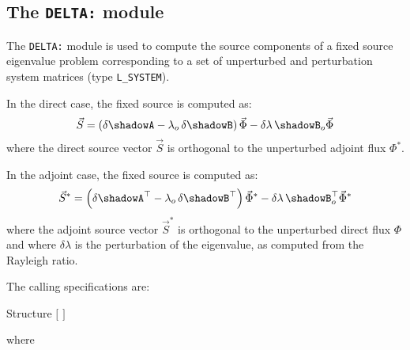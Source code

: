 \subsection{The {\tt DELTA:} module}

The {\tt DELTA:} module is used to compute the source components of a fixed source eigenvalue problem corresponding to a set of 
unperturbed and perturbation system matrices (type {\tt L\_SYSTEM}).

In the direct case, the fixed source is computed as:
\begin{equation}
\vec S=\left( \delta\shadowA - \lambda_o \, \delta \shadowB\right) \vec \Phi - \delta \lambda \, \shadowB_o\vec \Phi
\end{equation}
\noindent where the direct source vector $\vec S$ is orthogonal to the unperturbed adjoint flux $\Phi^*$.

In the adjoint case, the fixed source is computed as:
\begin{equation}
\vec S^*=\left( \delta \shadowA^\top - \lambda_o \, \delta \shadowB^\top\right) \vec \Phi^*- \delta \lambda \, \shadowB_o^\top\vec \Phi^*
\end{equation}
\noindent where the adjoint source vector $\vec S^*$ is orthogonal to the unperturbed direct flux $\Phi$ and where $\delta \lambda$ is the perturbation of the eigenvalue, as computed from the Rayleigh ratio.

The calling specifications are:

\begin{DataStructure}{Structure }
 \moc{:=}  $[$  $]$     \moc{::} 
\end{DataStructure}

\goodbreak
\noindent where

